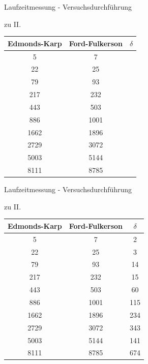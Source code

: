 \documentclass{beamer}
\begin{document}
    \begin{frame}{Laufzeitmessung - Versuchsdurchf\"uhrung}
        \begin{block}{zu II.}
            \begin{center}
                \begin{tabular}{c|c|c}
                    \textbf{Edmonds-Karp} & \textbf{Ford-Fulkerson} & $\delta$\\
                    \hline
                    5 & 7 &\\
                    22 & 25 &\\
                    79 & 93 &\\
                    217 & 232 &\\
                    443 & 503 &\\
                    886 & 1001 &\\
                    1662 & 1896 &\\
                    2729 & 3072 &\\
                    5003 & 5144 &\\
                    8111 & 8785 &\\
                \end{tabular}
            \end{center}
        \end{block}
    \end{frame}

    \begin{frame}{Laufzeitmessung - Versuchsdurchf\"uhrung}
        \begin{block}{zu II.}
            \begin{center}
                \begin{tabular}{c|c|c}
                    \textbf{Edmonds-Karp} & \textbf{Ford-Fulkerson} & $\delta$\\
                    \hline
                    5 & 7 & 2\\
                    22 & 25 & 3\\
                    79 & 93 & 14\\
                    217 & 232 & 15\\
                    443 & 503 & 60\\
                    886 & 1001 & 115\\
                    1662 & 1896 & 234\\
                    2729 & 3072 & 343\\
                    5003 & 5144 & 141\\
                    8111 & 8785 & 674\\
                \end{tabular}
            \end{center}
        \end{block}
    \end{frame}
\end{document}
